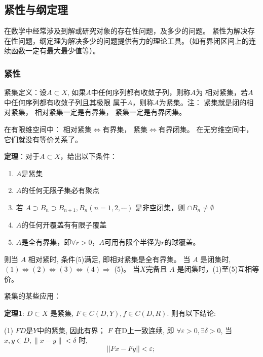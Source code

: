 \documentclass[12pt,a4paper]{article}
\begin{document}
\subsection{紧性与纲定理}
在数学中经常涉及到解或研究对象的存在性问题，及多少的问题。
 紧性为解决存在性问题，纲定理为解决多少的问题提供有力的理论工具。（如有界闭区间上的连续函数一定有最大最少值等）。
 
\subsubsection{紧性}
紧集定义：设$A\subset X$,  如果$A$中任何序列都有收敛子列，则称$A$为
                    相对紧集，若$A$中任何序列都有收敛子列且其极限
                    属于$A$，则称$A$为紧集。注：     紧集就是闭的相对紧集，
               相对紧集一定是有界集， 紧集一定是有界闭集。

在有限维空间中：  相对紧集$\Leftrightarrow$有界集， 紧集$\Leftrightarrow$有界闭集。
在无穷维空间中， 它们就没有等价关系了。

\textbf{定理}：对于$A\subset X$，给出以下条件：
\begin{enumerate}
	\item $A$是紧集
	\item $A$的任何无限子集必有聚点
	\item 若 $A \supset B_{n} \supset B_{n+1}, B_{n}(n=1,2, \cdots)$ 是非空闭集，则 $\cap B_{n} \neq \emptyset$
	\item $A$的任何开覆盖有有限子覆盖
	\item $A$是全有界集，即$\forall r>0$，$A$可用有限个半径为$r$的球覆盖。
\end{enumerate}
则当 $A$ 相对紧时, 条件(5)满足, 即相对紧集是全有界集。
当 $A$ 是闭集时, $(1) \Leftrightarrow(2) \Leftrightarrow(3) \Leftrightarrow(4) \Rightarrow$ (5)。
当$X$完备且 $A$ 是闭集时，(1)至(5)互相等价。

紧集的某些应用：

\textbf{定理1}: $D \subset X$ 是紧集, $F \in C(D, Y), f \in C(D, R)$. 则有以下结论:

(1) $FD$是$Y$中的紧集, 因此有界； $F$ 在D上一致连续, 即 $\forall \varepsilon>0, \exists \delta>0$, 当 $x, y \in D,\|x-y\|<\delta$ 时,
$$
|| F x-F y||<\varepsilon \text {; }
$$
\end{document}
